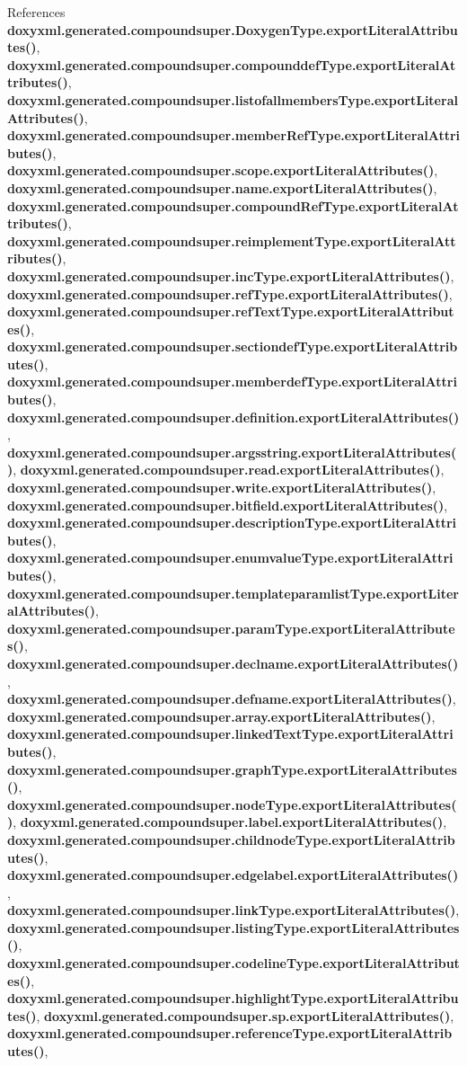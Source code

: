 References {\bf doxyxml.\+generated.\+compoundsuper.\+Doxygen\+Type.\+export\+Literal\+Attributes()}, {\bf doxyxml.\+generated.\+compoundsuper.\+compounddef\+Type.\+export\+Literal\+Attributes()}, {\bf doxyxml.\+generated.\+compoundsuper.\+listofallmembers\+Type.\+export\+Literal\+Attributes()}, {\bf doxyxml.\+generated.\+compoundsuper.\+member\+Ref\+Type.\+export\+Literal\+Attributes()}, {\bf doxyxml.\+generated.\+compoundsuper.\+scope.\+export\+Literal\+Attributes()}, {\bf doxyxml.\+generated.\+compoundsuper.\+name.\+export\+Literal\+Attributes()}, {\bf doxyxml.\+generated.\+compoundsuper.\+compound\+Ref\+Type.\+export\+Literal\+Attributes()}, {\bf doxyxml.\+generated.\+compoundsuper.\+reimplement\+Type.\+export\+Literal\+Attributes()}, {\bf doxyxml.\+generated.\+compoundsuper.\+inc\+Type.\+export\+Literal\+Attributes()}, {\bf doxyxml.\+generated.\+compoundsuper.\+ref\+Type.\+export\+Literal\+Attributes()}, {\bf doxyxml.\+generated.\+compoundsuper.\+ref\+Text\+Type.\+export\+Literal\+Attributes()}, {\bf doxyxml.\+generated.\+compoundsuper.\+sectiondef\+Type.\+export\+Literal\+Attributes()}, {\bf doxyxml.\+generated.\+compoundsuper.\+memberdef\+Type.\+export\+Literal\+Attributes()}, {\bf doxyxml.\+generated.\+compoundsuper.\+definition.\+export\+Literal\+Attributes()}, {\bf doxyxml.\+generated.\+compoundsuper.\+argsstring.\+export\+Literal\+Attributes()}, {\bf doxyxml.\+generated.\+compoundsuper.\+read.\+export\+Literal\+Attributes()}, {\bf doxyxml.\+generated.\+compoundsuper.\+write.\+export\+Literal\+Attributes()}, {\bf doxyxml.\+generated.\+compoundsuper.\+bitfield.\+export\+Literal\+Attributes()}, {\bf doxyxml.\+generated.\+compoundsuper.\+description\+Type.\+export\+Literal\+Attributes()}, {\bf doxyxml.\+generated.\+compoundsuper.\+enumvalue\+Type.\+export\+Literal\+Attributes()}, {\bf doxyxml.\+generated.\+compoundsuper.\+templateparamlist\+Type.\+export\+Literal\+Attributes()}, {\bf doxyxml.\+generated.\+compoundsuper.\+param\+Type.\+export\+Literal\+Attributes()}, {\bf doxyxml.\+generated.\+compoundsuper.\+declname.\+export\+Literal\+Attributes()}, {\bf doxyxml.\+generated.\+compoundsuper.\+defname.\+export\+Literal\+Attributes()}, {\bf doxyxml.\+generated.\+compoundsuper.\+array.\+export\+Literal\+Attributes()}, {\bf doxyxml.\+generated.\+compoundsuper.\+linked\+Text\+Type.\+export\+Literal\+Attributes()}, {\bf doxyxml.\+generated.\+compoundsuper.\+graph\+Type.\+export\+Literal\+Attributes()}, {\bf doxyxml.\+generated.\+compoundsuper.\+node\+Type.\+export\+Literal\+Attributes()}, {\bf doxyxml.\+generated.\+compoundsuper.\+label.\+export\+Literal\+Attributes()}, {\bf doxyxml.\+generated.\+compoundsuper.\+childnode\+Type.\+export\+Literal\+Attributes()}, {\bf doxyxml.\+generated.\+compoundsuper.\+edgelabel.\+export\+Literal\+Attributes()}, {\bf doxyxml.\+generated.\+compoundsuper.\+link\+Type.\+export\+Literal\+Attributes()}, {\bf doxyxml.\+generated.\+compoundsuper.\+listing\+Type.\+export\+Literal\+Attributes()}, {\bf doxyxml.\+generated.\+compoundsuper.\+codeline\+Type.\+export\+Literal\+Attributes()}, {\bf doxyxml.\+generated.\+compoundsuper.\+highlight\+Type.\+export\+Literal\+Attributes()}, {\bf doxyxml.\+generated.\+compoundsuper.\+sp.\+export\+Literal\+Attributes()}, {\bf doxyxml.\+generated.\+compoundsuper.\+reference\+Type.\+export\+Literal\+Attributes()}, 